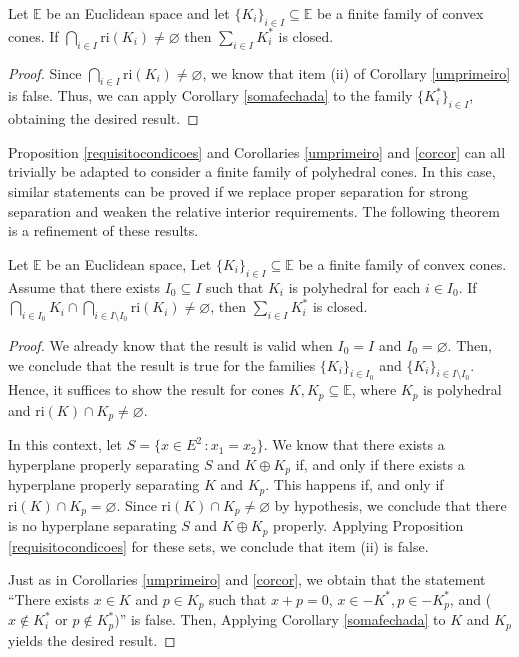 \documentclass[a4paper]{article}
\begin{document}
\begin{corollary}\label{corcor}
 Let \(\mathbb{E}\) be an Euclidean space and let \(\{K_i\}_{i\in I}\subseteq\mathbb{E}\) be a
 finite family of convex cones. If \(\bigcap_{i\in I}\text{ri}(K_i)\not=\varnothing\)
 then \(\sum_{i\in I }K_i^\ast\) is closed. 
 \end{corollary}
 \begin{proof}
 Since \(\bigcap_{i\in I}\text{ri}(K_i)\not=\varnothing\), we know that item
 (ii) of Corollary \ref{umprimeiro} is false. Thus, we can apply Corollary
 \ref{somafechada} to the family \(\{K_i^\ast\}_{i\in I}\), obtaining the
 desired result.
\end{proof}

Proposition \ref{requisitocondicoes} and Corollaries
\ref{umprimeiro} and \ref{corcor} can all trivially be adapted to  consider a
finite family of polyhedral cones. In this case, similar statements can be
proved if we replace proper separation for strong separation and weaken the
relative interior requirements. The following theorem is a refinement of
these results.

\begin{theorem}\label{minklosed}
Let $\mathbb{E}$ be an Euclidean space, Let \(\{K_i\}_{i\in
  I}\subseteq\mathbb{E}\) be a finite family of convex cones. Assume that there exists
\(I_0\subseteq I\) such that \(K_i\) is polyhedral for each \(i\in I_0\). If
$\bigcap_{i\in I_0}K_i\cap\bigcap_{i\in I\setminus
  I_0}\text{ri}(K_i)\not=\varnothing $, then $\sum_{i\in I}K_i^\ast$ is  closed.
\end{theorem}
\begin{proof}
We already know that the result is valid when \(I_0=I\) and \(I_0=\varnothing\).
Then, we conclude that the result is true for the families \(\{K_i\}_{i\in
  I_0}\) and \(\{K_i\}_{i\in I\setminus I_0}\). Hence, it suffices to show the
result for cones \(K, K_p\subseteq\mathbb{E}\), where \(K_p\) is polyhedral and
\(\text{ri}(K)\cap K_p\not=\varnothing\).


 In this context, let \(S=\{x\in E^2\,\colon
x_1=x_2\}\). We know that there exists a hyperplane properly separating \(S\) and \(K\oplus
K_p\) if, and only if there exists a hyperplane properly separating \(K\) and
\(K_p\). This happens if, and only if
\(\text{ri}(K)\cap K_p=\varnothing\). Since \mbox{\(\text{ri}(K)\cap
K_p\not=\varnothing\)} by hypothesis, we conclude that there is no hyperplane
separating \(S\) and \(K\oplus K_p\) properly. Applying Proposition
\ref{requisitocondicoes}  for these sets, we conclude that item (ii) is false. 

Just as in Corollaries \ref{umprimeiro} and \ref{corcor}, we obtain that the
statement ``There exists \(x \in K\) and \(p\in K_p\) such that \(x+p=0\), \(x\in -K^\ast,p\in-K_p^\ast\), and (\(x\not\in
  K_i^\ast\) or \(p\not\in K_p^\ast)\)'' is false. Then, Applying Corollary
 \ref{somafechada} to \(K\) and \(K_p\) yields the
 desired result.   
\end{proof}
\end{document}
